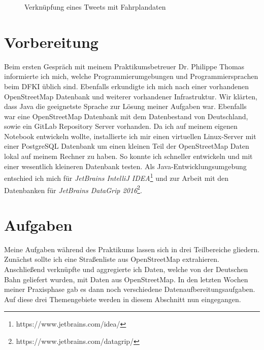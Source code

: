 \begin{figure}
   \centering
   \caption{Verknüpfung eines Tweets mit Fahrplandaten\protect\cite{WEB:SD4M:Presentation:2016}}
   \label{fig:tweetXfahrplan}
 \end{figure}

\section{Vorbereitung}
\label{sec:main:preparation}
Beim ersten Gespräch mit meinem Praktikumsbetreuer Dr. Philippe Thomas informierte ich mich, welche Programmierumgebungen und Programmiersprachen beim DFKI üblich sind.
Ebenfalls erkundigte ich mich nach einer vorhandenen OpenStreetMap Datenbank und weiterer vorhandener Infrastruktur.
Wir klärten, dass Java die geeignetste Sprache zur Lösung meiner Aufgaben war. 
Ebenfalls war eine OpenStreetMap Datenbank mit dem Datenbestand von Deutschland, sowie ein GitLab Repository Server vorhanden.
Da ich auf meinem eigenen Notebook entwickeln wollte, installierte ich mir einen virtuellen Linux-Server mit einer PostgreSQL Datenbank um einen kleinen Teil der OpenStreetMap Daten lokal auf meinem Rechner zu haben.
So konnte ich schneller entwickeln und mit einer wesentlich kleineren Datenbank testen.
Als Java-Entwicklungsumgebung entschied ich mich für \textit{JetBrains IntelliJ IDEA}\footnote{https://www.jetbrains.com/idea/} und zur Arbeit mit den Datenbanken für \textit{JetBrains DataGrip 2016}\footnote{https://www.jetbrains.com/datagrip/}.

\section{Aufgaben}
Meine Aufgaben während des Praktikums lassen sich in drei Teilbereiche gliedern. Zunächst sollte ich eine Straßenliste aus OpenStreetMap extrahieren. Anschließend verknüpfte und aggregierte ich Daten, welche von der Deutschen Bahn geliefert wurden, mit Daten aus OpenStreetMap. In den letzten Wochen meiner Praxisphase gab es dann noch verschiedene Datenaufbereitungsaufgaben. Auf diese drei Themengebiete werden in diesem Abschnitt nun eingegangen.

